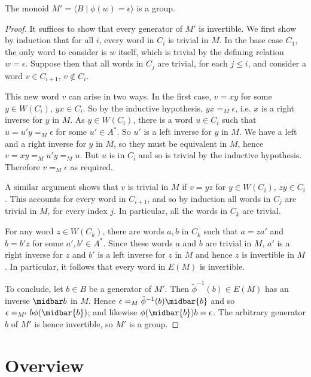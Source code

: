 \documentclass[noinsetproof,widepage,11pt,libertine]{lmaths}
\begin{document}
\begin{prop}
	The monoid $M' = \langle B \mid \phi(w) = \epsilon\rangle$ is a group.
\end{prop}
\begin{proof}
	\vspace{-2\parskip}
	It suffices to show that every generator of $M'$ is invertible. We first show by induction that for all $i$, every word in $C_i$ is trivial in $M$. In the base case $C_1$, the only word to consider is $w$ itself, which is trivial by the defining relation $w = \epsilon$. Suppose then that all words in $C_j$ are trivial, for each $j \le i$, and consider a word $v \in C_{i+1}$, $v \not\in C_i$.

	This new word $v$ can arise in two ways. In the first case, $v = xy$ for some $y \in W(C_i)$, $yx \in C_i$. So by the inductive hypothesis, $yx =_M \epsilon$, i.e. $x$ is a right inverse for $y$ in $M$. As $y \in W(C_i)$, there is a word $u \in C_i$ such that $u = u'y =_M \epsilon$ for some $u' \in A^*$. So $u'$ is a left inverse for $y$ in $M$. We have a left and a right inverse for $y$ in $M$, so they must be equivalent in $M$, hence $v = xy =_M u'y =_M u$. But $u$ is in $C_i$ and so is trivial by the inductive hypothesis. Therefore $v =_M \epsilon$ as required.

	A similar argument shows that $v$ is trivial in $M$ if $v = yz$ for $y \in W(C_i)$, $zy \in C_i$. This accounts for every word in $C_{i+1}$, and so by induction all words in $C_j$ are trivial in $M$, for every index $j$. In particular, all the words in $C_k$ are trivial.

	For any word $z \in W(C_k)$, there are words $a, b$ in $C_k$ such that $a = za'$ and $b = b'z$ for some $a', b' \in A^*$. Since these words $a$ and $b$ are trivial in $M$, $a'$ is a right inverse for $z$ and $b'$ is a left inverse for $z$ in $M$ and hence $z$ is invertible in $M$. In particular, it follows that every word in $E(M)$ is invertible.

	To conclude, let $b \in B$ be a generator of $M'$. Then $\tilde\phi^{-1}(b) \in E(M)$ has an inverse $\midbar b$ in $M$. Hence $\epsilon =_M \tilde\phi^{-1}(b) \midbar{b}$ and so $\epsilon =_{M'} b\phi(\midbar{b})$; and likewise $\phi(\midbar{b})b = \epsilon$. The arbitrary generator $b$ of $M'$ is hence invertible, so $M'$ is a group.
\end{proof}

\clearpage
\linespread{1}
\section*{Overview}
\end{document}
